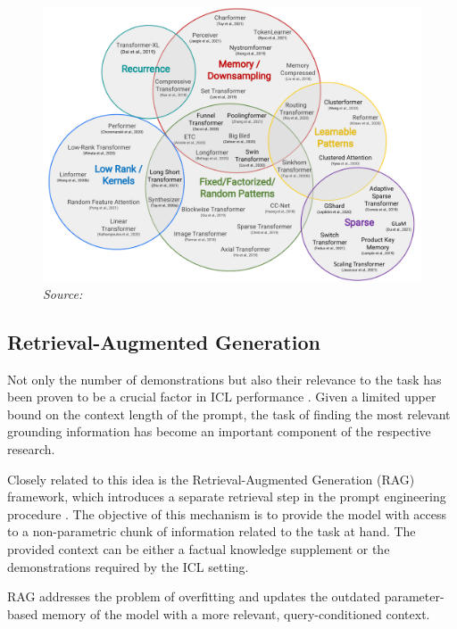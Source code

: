 \begin{figure}[ht]
    \centering
    \includegraphics[width=\textwidth]{figures/taxonomy-of-transformers.pdf}
    \label{fig:taxonomy-of-transformers}
    \hfill\textit{Source: \citet{tay2022}}
\end{figure}

\subsection{Retrieval-Augmented Generation}

Not only the number of demonstrations but also their relevance to the task has been proven to be a crucial factor in ICL performance \parencite{liu2021}. Given a limited upper bound on the context length of the prompt, the task of finding the most relevant grounding information has become an important component of the respective research.

Closely related to this idea is the Retrieval-Augmented Generation (RAG) framework, which introduces a separate retrieval step in the prompt engineering procedure \parencite{lewis2020}. The objective of this mechanism is to provide the model with access to a non-parametric chunk of information related to the task at hand. The provided context can be either a factual knowledge supplement or the demonstrations required by the ICL setting.

\begin{sloppypar}
RAG addresses the problem of overfitting and updates the outdated parameter-based memory of the model with a more relevant, query-conditioned context.
\end{sloppypar}

